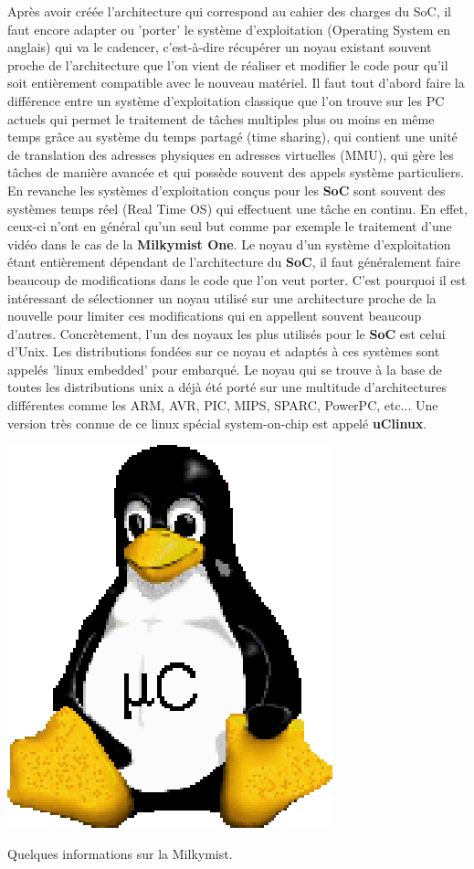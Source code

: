 \vspace{15px}
Après avoir créée l'architecture qui correspond au cahier des charges du SoC,
il faut encore adapter ou 'porter' le système d'exploitation (Operating System
en anglais) qui va le cadencer, c'est-à-dire récupérer un noyau existant
souvent proche de l'architecture que l'on vient de réaliser et modifier le code
pour qu'il soit entièrement compatible avec le nouveau matériel.  Il faut tout
d'abord faire la différence entre un système d'exploitation classique que l'on
trouve sur les PC actuels qui permet le traitement de tâches multiples plus ou
moins en même temps grâce au système du temps partagé (time sharing), qui
contient une unité de translation des adresses physiques en adresses virtuelles
(MMU), qui gère les tâches de manière avancée et qui possède souvent des appels
système particuliers. En revanche les systèmes d'exploitation conçus pour les
{\bf SoC} sont souvent des systèmes temps réel (Real Time OS) qui effectuent
une tâche en continu. En effet, ceux-ci n'ont en général qu'un seul but comme
par exemple le traitement d'une vidéo dans le cas de la {\bf Milkymist One}.
\medskip Le noyau d'un système d'exploitation étant entièrement dépendant de
l'architecture du {\bf SoC}, il faut généralement faire beaucoup de
modifications dans le code que l'on veut porter. C'est pourquoi il est
intéressant de sélectionner un noyau utilisé sur une architecture proche de la
nouvelle pour limiter ces modifications qui en appellent souvent beaucoup
d'autres.  Concrètement, l'un des noyaux les plus utilisés pour le {\bf SoC}
est celui d'Unix. Les distributions fondées sur ce noyau et adaptés à ces
systèmes sont appelés 'linux embedded' pour embarqué. Le noyau qui se trouve à
la base de toutes les distributions unix a déjà été porté sur une multitude
d'architectures différentes comme les ARM, AVR, PIC, MIPS, SPARC, PowerPC,
etc... Une version très connue de ce linux spécial system-on-chip est appelé
{\bf uClinux}.  \medskip

\begin{center} \includegraphics[scale=0.4]{uclinux.eps} \end{center}
\vspace{15px} {\Large Quelques informations sur la Milkymist.}


